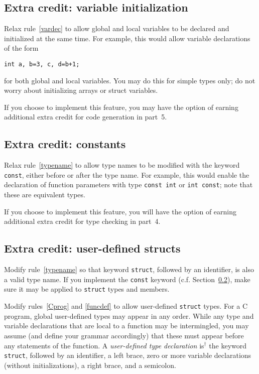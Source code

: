 \documentclass{article}
\newcommand{\iseasier}{is$^\dagger$ }
\newcommand{\typecheck}{4}
\newcommand{\codegen}{5}
\begin{document}
\subsection{Extra credit: variable initialization}
\label{SEC:firstextra}
\label{SEC:varinit}

Relax rule~\ref{vardec} to allow global and local variables to be
declared and initialized at the same time.
For example, this would allow variable declarations of the form
\begin{lstlisting}[numbers=none]
  int a, b=3, c, d=b+1;
\end{lstlisting}
for both global and local variables.
You may do this for simple types only;
do not worry about initializing arrays or struct variables.

If you choose to implement this feature,
you may have the option of earning
additional extra credit for code generation
in part~\codegen.

\subsection{Extra credit: constants}
\label{SEC:constants}

Relax rule~\ref{typename} to allow type names to be modified
with the keyword {\tt const}, either before or after the type name.
For example,
this would enable the declaration of function parameters
with type \lstinline{const int} or \lstinline{int const};
note that these are equivalent types.

If you choose to implement this feature,
you will have the option of earning
additional extra credit for type checking
in part~\typecheck.


\subsection{Extra credit: user-defined structs}
\label{SEC:userstructs}

Modify rule~\ref{typename} so that keyword {\tt struct},
followed by an identifier,
is also a valid type name.
If you implement the {\tt const} keyword (c.f. Section~\ref{SEC:constants}),
make sure it may be applied to {\tt struct} types
and members.

Modify rules~\ref{Cprog} and \ref{funcdef} to allow user-defined
{\tt struct} types.
For a C program, global user-defined types may appear in any order.
While any type and variable declarations that are local to a function
may be intermingled,
you may assume (and define your grammar accordingly)
that these must appear before any statements of the function.
A \emph{user-defined type declaration} \iseasier the keyword {\tt struct},
followed by an identifier, a left brace,
  zero or more variable declarations (without initializations),
a right brace, and a semicolon.
\end{document}

